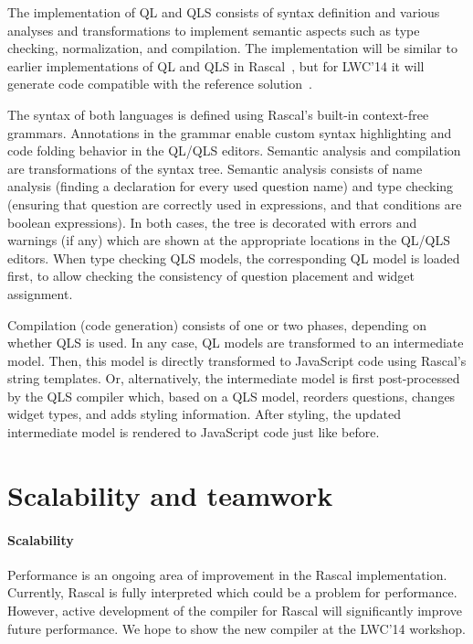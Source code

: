 \documentclass[a4paper]{article}
\begin{document}
The implementation of QL and QLS consists of syntax definition and
various analyses and transformations to implement semantic aspects
such as type checking, normalization, and compilation. The
implementation will be similar to earlier implementations of QL and
QLS in Rascal~\cite{QLRKemi,Demoqles}, but for LWC'14 it will generate
code compatible with the reference solution~\cite{ReferenceImpl}.

The syntax of both languages is defined using Rascal's built-in
context-free grammars. Annotations in the grammar enable custom syntax
highlighting and code folding behavior in the QL/QLS editors. Semantic
analysis and compilation are transformations of the syntax tree.
Semantic analysis consists of name analysis (finding a declaration for
every used question name) and type checking (ensuring that question
are correctly used in expressions, and that conditions are boolean
expressions). In both cases, the tree is decorated with errors and
warnings (if any) which are shown at the appropriate locations in the
QL/QLS editors. When type checking QLS models, the corresponding QL
model is loaded first, to allow checking the consistency of question
placement and widget assignment. 

Compilation (code generation) consists of one or two phases, depending
on whether QLS is used. In any case, QL models are transformed to an
intermediate model. Then, this model is directly transformed to
JavaScript code using Rascal's string templates. Or, alternatively,
the intermediate model is first post-processed by the QLS compiler
which, based on a QLS model, reorders questions, changes widget types,
and adds styling information. After styling, the updated intermediate
model is rendered to JavaScript code just like before.



\section{Scalability and teamwork}

\paragraph{Scalability}
Performance is an ongoing area of improvement in the Rascal
implementation. Currently, Rascal is fully interpreted which could be
a problem for performance. However, active development of the compiler
for Rascal will significantly improve future performance. We hope to
show the new compiler at the LWC'14 workshop. 
\end{document}
